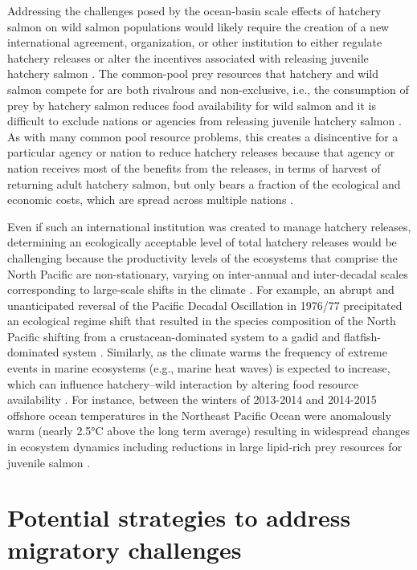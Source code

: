 Addressing the challenges posed by the ocean-basin scale effects of hatchery
salmon on wild salmon populations would likely require the creation of a new
international agreement, organization, or other institution to either regulate
hatchery releases or alter the incentives associated with releasing juvenile
hatchery salmon \citep{Holt2008b}. The common-pool prey resources that hatchery
and wild salmon compete for are both rivalrous and non-exclusive, i.e., the
consumption of prey by hatchery salmon reduces food availability for wild salmon
and it is difficult to exclude nations or agencies from releasing juvenile
hatchery salmon \citep{Hardin1968a}. As with many common pool resource problems,
this creates a disincentive for a particular agency or nation to reduce hatchery
releases because that agency or nation receives most of the benefits from the
releases, in terms of harvest of returning adult hatchery salmon, but only bears
a fraction of the ecological and economic costs, which are spread across
multiple nations \citep{Holt2008b}.

Even if such an international institution was created to manage hatchery
releases, determining an ecologically acceptable level of total hatchery
releases would be challenging because the productivity levels of the ecosystems
that comprise the North Pacific are non-stationary, varying on inter-annual and
inter-decadal scales corresponding to large-scale shifts in the climate
\citep{Hare1999a, Chavez2003a}. For example, an abrupt and unanticipated
reversal of the Pacific Decadal Oscillation in 1976/77 precipitated an
ecological regime shift that resulted in the species composition of the North
Pacific shifting from a crustacean-dominated system to a gadid and
flatfish-dominated system \citep{Mantua1997a, Anderson1999a, Mueter2000a}.
Similarly, as the climate warms the frequency of extreme events in marine
ecosystems (e.g., marine heat waves) is expected to increase, which can
influence hatchery--wild interaction by altering food resource availability
\citep{Jentsch2007, DiLorenzo2016}. For instance, between the winters of
2013-2014 and 2014-2015 offshore ocean temperatures in the Northeast Pacific
Ocean were anomalously warm (nearly 2.5°C above the long term average) resulting
in widespread changes in ecosystem dynamics including reductions in large
lipid-rich prey resources for juvenile salmon \citep{Bond2015, DiLorenzo2016}.



\section{Potential strategies to address migratory challenges}

